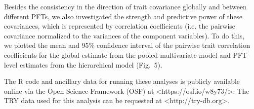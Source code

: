 Besides the consistency in the direction of trait covariance globally and between different PFTs, we also investigated the strength and predictive power of these covariances, which is represented by correlation coefficients (i.e. the pairwise covariance normalized to the variances of the component variables).
To do this, we plotted the mean and 95\% confidence interval of the pairwise trait correlation coefficients for the global estimate from the pooled multivariate model and PFT-level estimates from the hierarchical model (Fig.\ 5).

The R code and ancillary data for running these analyses is publicly available online via the Open Science Framework (OSF) at <https://osf.io/w8y73/>.
The TRY data used for this analysis can be requested at <http://try-db.org>.
